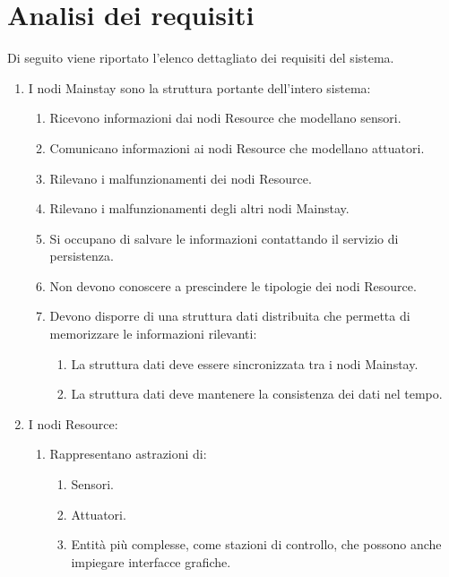 \documentclass[12pt]{article}
\begin{document}
\newpage



\section{Analisi dei requisiti}

Di seguito viene riportato l'elenco dettagliato dei requisiti del sistema.

\begin{enumerate}
    \item I nodi Mainstay sono la struttura portante dell'intero sistema:
    \begin{enumerate}
        \item Ricevono informazioni dai nodi Resource che modellano sensori.
        \item Comunicano informazioni ai nodi Resource che modellano attuatori.
        \item Rilevano i malfunzionamenti dei nodi Resource.
        \item Rilevano i malfunzionamenti degli altri nodi Mainstay.
        \item Si occupano di salvare le informazioni contattando il servizio di persistenza.
        \item Non devono conoscere a prescindere le tipologie dei nodi Resource.
        \item Devono disporre di una struttura dati distribuita che permetta di memorizzare le informazioni rilevanti:
        \begin{enumerate}
            \item La struttura dati deve essere sincronizzata tra i nodi Mainstay.
            \item La struttura dati deve mantenere la consistenza dei dati nel tempo.
        \end{enumerate}
    \end{enumerate}
    \item I nodi Resource:
    \begin{enumerate}
        \item Rappresentano astrazioni di:
        \begin{enumerate}
            \item Sensori.
            \item Attuatori.
            \item Entità più complesse, come stazioni di controllo, che possono anche impiegare interfacce grafiche.

\end{enumerate}
\end{enumerate}
\end{enumerate}
\end{document}
